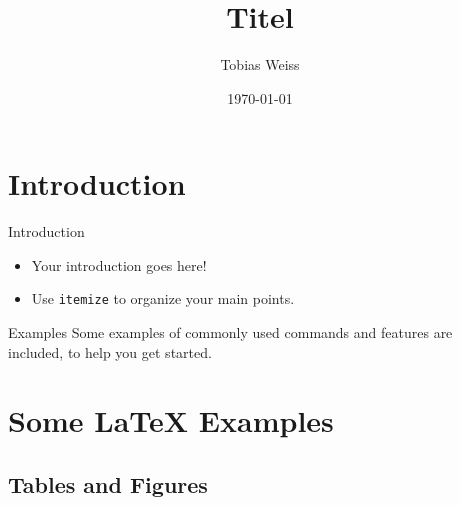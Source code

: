 \documentclass[14pt]{beamer}
\begin{document}
\title{Titel}
\author{Tobias Weiss}
\date{\today} 

\begin{frame}
\titlepage
\end{frame}


\section{Introduction}

\begin{frame}{Introduction}

\begin{itemize}
  \item Your introduction goes here!
  \item Use \texttt{itemize} to organize your main points.
\end{itemize}

\vskip 1cm

\begin{block}{Examples}
Some examples of commonly used commands and features are included, to help you get started.
\end{block}

\end{frame}

\section{Some \LaTeX{} Examples}

\subsection{Tables and Figures}
\end{document}
